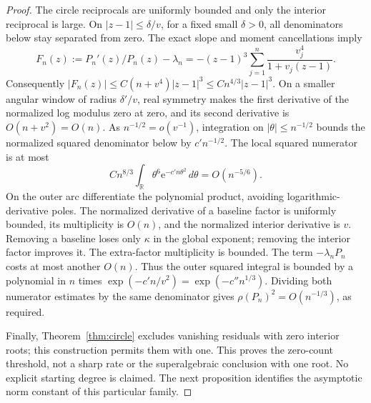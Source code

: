 \documentclass[11pt]{article}
\theoremstyle{remark}\newtheorem{remark}[theorem]{Remark}
\newcommand{\ee}{\mathrm e}
\begin{document}
\begin{proof}
The circle reciprocals are uniformly bounded and only the interior
reciprocal is large. On \(|z-1|\le\delta/v\), for a fixed small
\(\delta>0\), all denominators below stay separated from zero.
The exact slope and moment cancellations imply
\[
 F_n(z):=P_n'(z)/P_n(z)-\lambda_n
 =-(z-1)^3\sum_{j=1}^n\frac{v_j^4}{1+v_j(z-1)}.
\]
Consequently \(|F_n(z)|\le C(n+v^4)|z-1|^3
\le Cn^{4/3}|z-1|^3\). On a smaller angular window of radius
\(\delta'/v\), real symmetry makes the first derivative of the
normalized log modulus zero at zero, and its second derivative is
\(O(n+v^2)=O(n)\). As \(n^{-1/2}=o(v^{-1})\), integration
on \(|\theta|\le n^{-1/2}\) bounds the normalized squared
denominator below by \(c'n^{-1/2}\). The local squared numerator
is at most
\[
 Cn^{8/3}\int_{\mathbb R}\theta^6\ee^{-c'n\theta^2}\,d\theta
 =O(n^{-5/6}).
\]
On the outer arc differentiate the polynomial product, avoiding
logarithmic-derivative poles. The normalized derivative of a baseline
factor is uniformly bounded, its multiplicity is \(O(n)\), and
the normalized interior derivative is \(v\). Removing a baseline
loses only \(\kappa\) in the global exponent; removing the interior
factor improves it. The extra-factor multiplicity is bounded.
The term \(-\lambda_nP_n\) costs at most another \(O(n)\).
Thus the outer squared integral is bounded by a polynomial in
\(n\) times \(\exp(-c'n/v^2)=\exp(-c''n^{1/3})\).
Dividing both numerator estimates by the same denominator gives
\(\rho(P_n)^2=O(n^{-1/3})\), as required.

Finally, Theorem~\ref{thm:circle} excludes vanishing residuals with
zero interior roots; this construction permits them with one.
This proves the zero-count threshold, not a sharp rate or the
superalgebraic conclusion with one root. No explicit starting
degree is claimed. The next proposition identifies the asymptotic
norm constant of this particular family.
\end{proof}
\end{document}
